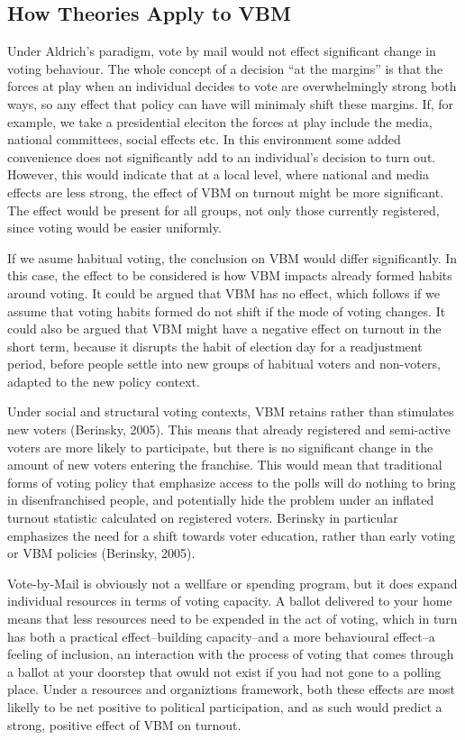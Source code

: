 \documentclass[12pt,twoside]{reedthesis}
\begin{document}
  \subsection{How Theories Apply to VBM}\label{how-theories-apply-to-vbm}
  
  Under Aldrich's paradigm, vote by mail would not effect significant
  change in voting behaviour. The whole concept of a decision ``at the
  margins'' is that the forces at play when an individual decides to vote
  are overwhelmingly strong both ways, so any effect that policy can have
  will minimaly shift these margins. If, for example, we take a
  presidential eleciton the forces at play include the media, national
  committees, social effects etc. In this environment some added
  convenience does not significantly add to an individual's decision to
  turn out. However, this would indicate that at a local level, where
  national and media effects are less strong, the effect of VBM on turnout
  might be more significant. The effect would be present for all groups,
  not only those currently registered, since voting would be easier
  uniformly.
  
  If we asume habitual voting, the conclusion on VBM would differ
  significantly. In this case, the effect to be considered is how VBM
  impacts already formed habits around voting. It could be argued that VBM
  has no effect, which follows if we assume that voting habits formed do
  not shift if the mode of voting changes. It could also be argued that
  VBM might have a negative effect on turnout in the short term, because
  it disrupts the habit of election day for a readjustment period, before
  people settle into new groups of habitual voters and non-voters, adapted
  to the new policy context.
  
  Under social and structural voting contexts, VBM retains rather than
  stimulates new voters (Berinsky, 2005). This means that already
  registered and semi-active voters are more likely to participate, but
  there is no significant change in the amount of new voters entering the
  franchise. This would mean that traditional forms of voting policy that
  emphasize access to the polls will do nothing to bring in
  disenfranchised people, and potentially hide the problem under an
  inflated turnout statistic calculated on registered voters. Berinsky in
  particular emphasizes the need for a shift towards voter education,
  rather than early voting or VBM policies (Berinsky, 2005).
  
  Vote-by-Mail is obviously not a wellfare or spending program, but it
  does expand individual resources in terms of voting capacity. A ballot
  delivered to your home means that less resources need to be expended in
  the act of voting, which in turn has both a practical effect--building
  capacity--and a more behavioural effect--a feeling of inclusion, an
  interaction with the process of voting that comes through a ballot at
  your doorstep that owuld not exist if you had not gone to a polling
  place. Under a resources and organiztions framework, both these effects
  are most likelly to be net positive to political participation, and as
  such would predict a strong, positive effect of VBM on turnout.
  
\end{document}
